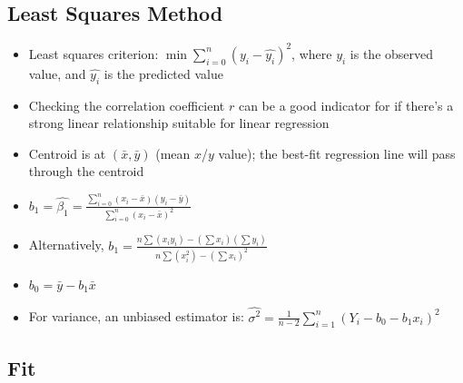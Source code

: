 \documentclass{article}
\begin{document}
\subsection{Least Squares Method}

\begin{itemize}
    \item Least squares criterion: $\min \sum_{i=0}^{n}(y_i - \hat{y_i})^2$, where $y_i$ is the observed value, and $\hat{y_i}$ is the predicted value
    \item Checking the correlation coefficient $r$ can be a good indicator for if there's a strong linear relationship suitable for linear regression
    \item Centroid is at $(\bar{x},\bar{y})$ (mean $x$/$y$ value); the best-fit regression line will pass through the centroid
    \item $b_1=\hat{\beta_1}=\frac{\sum_{i=0}^{n}(x_i-\bar{x})(y_i-\bar{y})}{\sum_{i=0}^{n}(x_i-\bar{x})^2}$
    \item Alternatively, $b_1=\frac{n\sum(x_i y_i)-(\sum x_i)(\sum y_i)}{n \sum (x_i^2)-(\sum x_i)^2}$
    \item $b_0=\bar{y}-b_1\bar{x}$
    \item For variance, an unbiased estimator is: $\hat{\sigma^2}=\frac{1}{n-2} \sum_{i=1}^n (Y_i-b_0-b_1x_i)^2$
\end{itemize}

\subsection{Fit}
\end{document}
